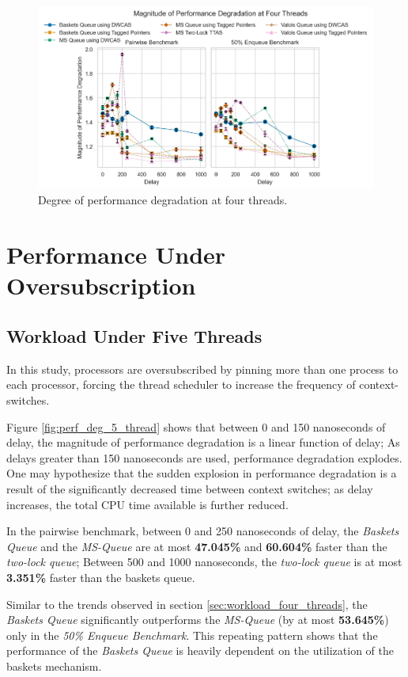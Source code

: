 \begin{figure}[!ht]
    \centering
    \includegraphics[width=1\textwidth]{images/plots/speedup_3.jpg}
    \caption{Degree of performance degradation at four threads.}
    \label{fig:perf_deg_4_thread}
\end{figure}

\pagebreak

\section{Performance Under Oversubscription}
\subsection{Workload Under Five Threads}
In this study, processors are oversubscribed by pinning more than one process
to each processor, forcing the thread scheduler to increase the frequency of
context-switches.

Figure \ref{fig:perf_deg_5_thread} shows that between 0 and 150 nanoseconds of delay, the
magnitude of performance degradation is a linear function of delay; As delays
greater than 150 nanoseconds are used, performance degradation explodes.
One may hypothesize that the sudden explosion in performance degradation is a result of
the significantly decreased time between context switches; as delay increases, 
the total CPU time available is further reduced.

In the pairwise benchmark, between 0 and 250 nanoseconds of delay, the \emph{Baskets
Queue} and the \emph{MS-Queue} are at most
\textbf{47.045\%} and \textbf{60.604\%} faster than the \emph{two-lock queue};
Between 500 and 1000 nanoseconds, the \emph{two-lock queue} is at most \textbf{3.351\%}
faster than the baskets queue.

Similar to the trends observed in section \ref{sec:workload_four_threads}, the \emph{Baskets
Queue} significantly outperforms the \emph{MS-Queue} (by at most \textbf{53.645\%}) only
in the \emph{50\% Enqueue Benchmark}. This repeating pattern shows that the performance of the
\emph{Baskets Queue} is heavily dependent on the utilization of the baskets mechanism.

